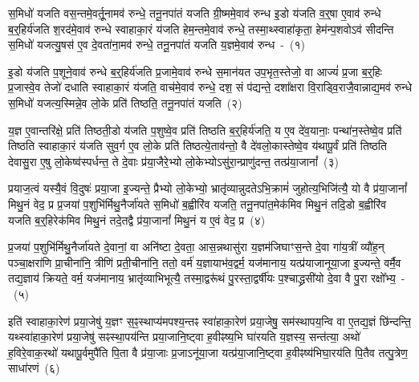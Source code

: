 \setcounter{anuvakam}{0}
स॒मिधो॑ यजति वस॒न्तमे॒वर्तू॒नामव॑ रुन्धे॒ तनू॒नपा॑तं यजति ग्री॒ष्ममे॒वाव॑ रुन्ध इ॒डो य॑जति व॒र्॒\mbox{}षा ए॒वाव॑ रुन्धे ब॒र्॒\mbox{}हिर्य॑जति श॒रद॑मे॒वाव॑ रुन्धे स्वाहाका॒रं य॑जति हेम॒न्तमे॒वाव॑ रुन्धे॒ तस्मा॒थ्\-स्वाहा॑कृता॒ हेम॑न्प॒शवो\-ऽव॑ सीदन्ति स॒मिधो॑ यजत्यु॒षस॑ ए॒व दे॒वता॑ना॒मव॑ रुन्धे॒ तनू॒नपा॑तं यजति य॒ज्ञमे॒वाव॑ रुन्ध~-~(१)

इ॒डो य॑जति प॒शूने॒वाव॑ रुन्धे ब॒र्॒\mbox{}हिर्य॑जति प्र॒जामे॒वाव॑ रुन्धे स॒मान॑यत उप॒भृत॒स्तेजो॒ वा आज्यं॑ प्र॒जा ब॒र्॒\mbox{}हिः प्र॒जास्वे॒व तेजो॑ दधाति स्वाहाका॒रं य॑जति॒ वाच॑मे॒वाव॑ रुन्धे॒ दश॒ सं प॑द्यन्ते॒ दशा᳚क्षरा वि॒राड्वि॒राजै॒वान्नाद्य॒मव॑ रुन्धे स॒मिधो॑ यजत्य॒स्मिन्ने॒व लो॒के प्रति॑ तिष्ठति॒ तनू॒नपा॑तं यजति~(२)

य॒ज्ञ ए॒वान्तरि॑क्षे॒ प्रति॑ तिष्ठती॒डो य॑जति प॒शुष्वे॒व प्रति॑ तिष्ठति ब॒र्॒\mbox{}हिर्य॑जति॒ य ए॒व दे॑व॒यानाः॒ पन्था॑न॒स्तेष्वे॒व प्रति॑ तिष्ठति स्वाहाका॒रं य॑जति सुव॒र्ग ए॒व लो॒के प्रति॑ तिष्ठत्ये॒ताव॑न्तो॒ वै दे॑व\-लो॒का\-स्तेष्वे॒व य॑थापू॒र्वं प्रति॑ तिष्ठति देवासु॒रा ए॒षु लो॒केष्व॑स्पर्धन्त॒ ते दे॒वाः प्र॑या॒जैरे॒भ्यो लो॒केभ्यो\-ऽसु॑रा॒न्प्राणु॑दन्त॒ तत्प्र॑या॒जानां᳚~(३)

प्रयाज॒त्वं यस्यै॒वं वि॒दुषः॑ प्रया॒जा इ॒ज्यन्ते॒ प्रैभ्यो लो॒केभ्यो॒ भ्रातृ॑व्यान्नुदते\-ऽभि॒क्रामं॑ जुहोत्य॒भिजि॑त्यै॒ यो वै प्र॑या॒जानां᳚ मिथु॒नं वेद॒ प्र प्र॒जया॑ प॒शुभि॑र्मिथु॒नैर्जा॑यते स॒मिधो॑ ब॒ह्वीरि॑व यजति॒ तनू॒नपा॑त॒मेक॑मिव मिथु॒नं तदि॒डो ब॒ह्वीरि॑व यजति ब॒र्॒\mbox{}हिरेक॑मिव मिथु॒नं तदे॒तद्वै प्र॑या॒जानां᳚ मिथु॒नं य ए॒वं वेद॒ प्र~(४)

प्र॒जया॑ प॒शुभि॑र्मिथु॒नैर्जा॑यते दे॒वानां॒ वा अनि॑ष्टा दे॒वता॒ आस॒\-न्नथा\-सु॑रा य॒ज्ञम॑\-जिघाꣳस॒न्ते दे॒वा गा॑य॒त्रीं व्यौ॑ह॒न् पञ्चा॒क्षरा॑णि प्रा॒ची\-ना॑नि॒ त्रीणि॑ प्रती॒चीना॑नि॒ ततो॒ वर्म॑ य॒ज्ञायाभ॑व॒द्वर्म॒ यज॑मानाय॒ यत्प्र॑या\-जा\-नू\-या॒जा इ॒ज्यन्ते॒ वर्मै॒व तद्य॒ज्ञाय॑ क्रियते॒ वर्म॒ यज॑मानाय॒ भ्रातृ॑व्या\-भिभूत्यै॒ तस्मा॒द्वरू॑थं पु॒रस्ता॒द्वर्\mbox{}षी॑यः प॒श्चाद्ध्रसी॑यो दे॒वा वै पु॒रा रक्षो᳚भ्य॒~-~(५)

इति॑ स्वाहा\-का॒रेण॑ प्रया॒जेषु॑ य॒ज्ञꣳ स॒ꣴ॒स्थाप्य॑मपश्य॒न्तꣴ स्वा॑हा\-का॒रेण॑ प्रया॒जेषु॒ सम॑स्थापय॒न्वि वा ए॒तद्य॒ज्ञं छि॑न्दन्ति॒ यथ्\-स्वा॑हा\-का॒रेण॑ प्रया॒जेषु॑ सꣴस्था॒पय॑न्ति प्रया॒जानि॒ष्ट्वा ह॒वीꣴष्य॒भि घा॑रयति य॒ज्ञस्य॒ सन्त॑त्या॒ अथो॑ ह॒विरे॒वाक॒रथो॑ यथापू॒र्वमुपै॑ति पि॒ता वै प्र॑या॒जाः प्र॒जा\-ऽनू॑या॒जा यत्प्र॑या॒जानि॒ष्ट्वा ह॒वीꣴष्य॑भिघा॒रय॑ति पि॒तैव तत्पु॒त्रेण॒ साधा॑रणं~(६)


